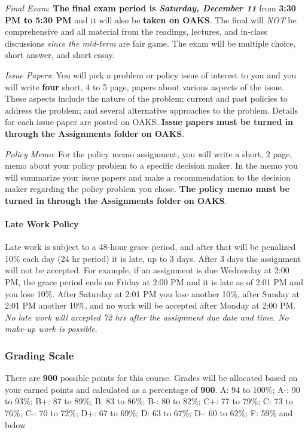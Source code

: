 \vspace{0.1in}

\noindent \emph{Final Exam}: \textbf{The final exam period is
\emph{Saturday, December 11}} from \textbf{3:30 PM to 5:30 PM} and it
will also be \textbf{taken on OAKS}. The final will \emph{NOT} be
comprehensive and all material from the readings, lectures, and in-class
discussions \emph{since the mid-term} are fair game. The exam will be
multiple choice, short answer, and short essay.

\vspace{0.1in}

\noindent \emph{Issue Papers}: You will pick a problem or policy issue
of interest to you and you will write \textbf{four} short, 4 to 5 page,
papers about various aspects of the issue. These aspects include the
nature of the problem; current and past policies to address the problem;
and several alternative approaches to the problem. Details for each
issue paper are posted on OAKS. \textbf{Issue papers must be turned in
through the Assignments folder on OAKS}.

\vspace{0.1in}

\noindent \emph{Policy Memo}: For the policy memo assignment, you will
write a short, 2 page, memo about your policy problem to a specific
decision maker. In the memo you will summarize your issue papers and
make a recommendation to the decision maker regarding the policy problem
you chose. \textbf{The policy memo must be turned in through the
Assignments folder on OAKS}.

\hypertarget{late-work-policy}{%
\paragraph{Late Work Policy}\label{late-work-policy}}

Late work is subject to a 48-hour grace period, and after that will be
penalized 10\% each day (24 hr period) it is late, up to 3 days. After 3
days the assignment will not be accepted. For example, if an assignment
is due Wednesday at 2:00 PM, the grace period ends on Friday at 2:00 PM
and it is late as of 2:01 PM and you lose 10\%. After Saturday at 2:01
PM you lose another 10\%, after Sunday at 2:01 PM another 10\%, and no
work will be accepted after Monday at 2:00 PM. \emph{No late work will
accepted 72 hrs after the assignment due date and time. No make-up work
is possible}.

\hypertarget{grading-scale}{%
\subsubsection{Grading Scale}\label{grading-scale}}

There are \textbf{900} possible points for this course. Grades will be
allocated based on your earned points and calculated as a percentage of
\textbf{900}. A: 94 to 100\%; A-: 90 to 93\%; B+: 87 to 89\%; B: 83 to
86\%; B-: 80 to 82\%; C+: 77 to 79\%; C: 73 to 76\%; C-: 70 to 72\%; D+:
67 to 69\%; D: 63 to 67\%; D-: 60 to 62\%; F: 59\% and below
